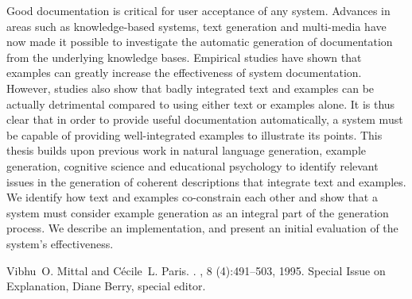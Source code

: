 \begin{thebibliography}{10}
{\leftskip=0.1in\rightskip=0.1in\begin{small}\par{}Good documentation is critical for user acceptance of any
system. Advances in areas such as knowledge-based systems, text
generation and multi-media have now made it possible to investigate the
automatic generation of documentation from the underlying knowledge
bases. Empirical studies have shown that examples can greatly increase
the effectiveness of system documentation. However, studies also show
that badly integrated text and examples can be actually detrimental
compared to using either text or examples alone. It is thus clear that
in order to provide useful documentation automatically, a system must be
capable of providing well-integrated examples to illustrate its points.
This thesis builds upon previous work in natural language generation,
example generation, cognitive science and educational psychology to
identify relevant issues in the generation of coherent descriptions that
integrate text and examples. We identify how text and examples
co-constrain each other and show that a system must consider example
generation as an integral part of the generation process. We describe an
implementation, and present an initial evaluation of the system's
effectiveness.\end{small}\par}
  
\noindent\hspace*{\itemindent}{\leftskip=0.1in\rightskip=0.1in\hrulefill}


Vibhu~O. Mittal and C{\'e}cile~L. Paris.
.
, 8 (4):491--503, 1995.
Special Issue on Explanation, Diane Berry, special editor.


\end{thebibliography}
